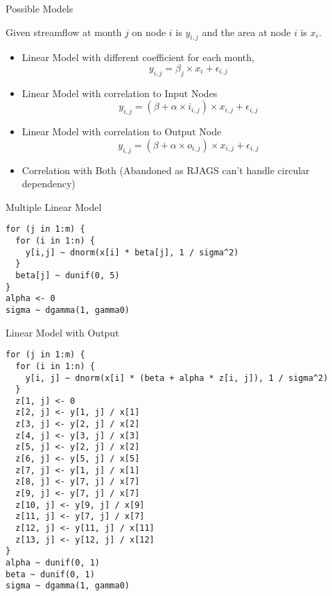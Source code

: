 \documentclass{beamer}
\begin{document}
\begin{frame}{Possible Models}

  Given streamflow at month \(j\) on node \(i\) is \(y_{i,j}\) and the area at node \(i\) is \(x_{i}\).

  \begin{itemize}
  \item Linear Model with different coefficient for each month,
    \begin{equation*}
      y_{i,j} = \beta_{j} \times x_{i} + \epsilon_{i,j}
    \end{equation*}
    
  \item Linear Model with correlation to Input Nodes
    \begin{equation*}
      y_{i,j} = (\beta + \alpha \times i_{i,j}) \times x_{i,j} + \epsilon_{i,j}
    \end{equation*}
    
  \item Linear Model with correlation to Output Node
    \begin{equation*}
      y_{i,j} = (\beta + \alpha \times o_{i,j}) \times x_{i,j} + \epsilon_{i,j}
    \end{equation*}

  \item Correlation with Both ({\color{red}Abandoned} as RJAGS can't handle circular dependency)
  \end{itemize}

\end{frame}

\begin{frame}[containsverbatim]{Multiple Linear Model}
  
\begin{verbatim}
for (j in 1:m) {
  for (i in 1:n) {
    y[i,j] ~ dnorm(x[i] * beta[j], 1 / sigma^2)
  }
  beta[j] ~ dunif(0, 5)
}
alpha <- 0
sigma ~ dgamma(1, gamma0)
\end{verbatim}
\end{frame}

\begin{frame}[containsverbatim]{Linear Model with Output}
\begin{verbatim}
for (j in 1:m) {
  for (i in 1:n) {
    y[i, j] ~ dnorm(x[i] * (beta + alpha * z[i, j]), 1 / sigma^2)
  }
  z[1, j] <- 0
  z[2, j] <- y[1, j] / x[1]
  z[3, j] <- y[2, j] / x[2]
  z[4, j] <- y[3, j] / x[3]
  z[5, j] <- y[2, j] / x[2]
  z[6, j] <- y[5, j] / x[5]
  z[7, j] <- y[1, j] / x[1]
  z[8, j] <- y[7, j] / x[7]
  z[9, j] <- y[7, j] / x[7]
  z[10, j] <- y[9, j] / x[9]
  z[11, j] <- y[7, j] / x[7]
  z[12, j] <- y[11, j] / x[11]
  z[13, j] <- y[12, j] / x[12]
}
alpha ~ dunif(0, 1)
beta ~ dunif(0, 1)
sigma ~ dgamma(1, gamma0)
\end{verbatim}
\end{frame}
\end{document}
